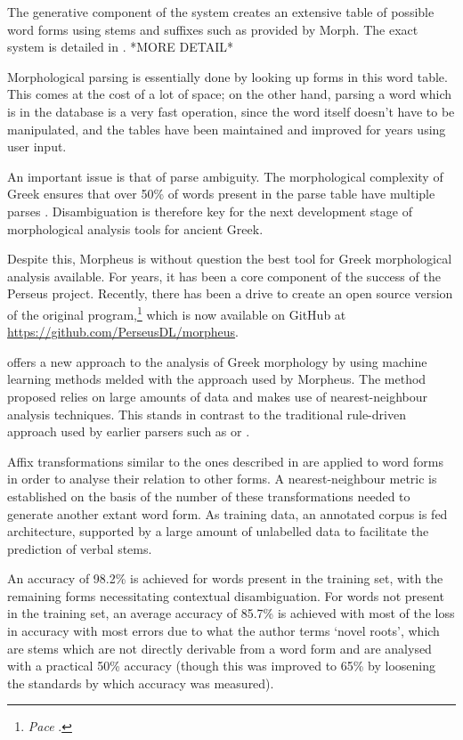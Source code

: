 The generative component of the system creates an extensive table of
possible word forms using stems and suffixes such as provided by
Morph. The exact system is detailed in \cite{crane1991generating}. *MORE DETAIL*

Morphological parsing is essentially done by looking up forms in this
word table. This comes at the cost of a lot of space; on the other
hand, parsing a word which is in the database is a very fast
operation, since the word itself doesn't have to be manipulated, and
the tables have been maintained and improved for years using
user input.

An important issue is that of parse ambiguity. The morphological
complexity of Greek ensures that over 50\% of words present in the
parse table have multiple parses \citep{dik2008}. Disambiguation is
therefore key for the next development stage of morphological analysis
tools for ancient Greek.

Despite this, Morpheus is without question the best tool for Greek
morphological analysis available. For years, it has been a core
component of the success of the Perseus project. Recently, there has
been a drive to create an open source version of the original
program,\footnote{\textit{Pace} \cite{blackwell2009}.} which is now
available on GitHub at \url{https://github.com/PerseusDL/morpheus}.

\cite{lee2008nearest} offers a new approach to the analysis of Greek
morphology by using machine learning methods melded with the approach
used by Morpheus. The method proposed relies on large amounts of data
and makes use of nearest-neighbour analysis techniques. This stands in
contrast to the traditional rule-driven approach used by earlier
parsers such as \cite{packard1973computer} or
\cite{crane1991generating}.

Affix transformations similar to the ones described in
\cite{packard1973computer} are applied to word forms in order to analyse their
relation to other forms. A nearest-neighbour metric is established on
the basis of the number of these transformations needed to generate
another extant word form. As training data, an annotated corpus is fed 
architecture, supported by a large amount of unlabelled data to
facilitate the prediction of verbal stems.

An accuracy of 98.2\% is achieved for words present in the training
set, with the remaining forms necessitating contextual
disambiguation. For words not present in the training set, an average
accuracy of 85.7\% is achieved with most of the loss in accuracy with
most errors due to what the author terms `novel roots', which are
stems which are not directly derivable from a word form and are
analysed with a practical 50\% accuracy (though this was improved to
65\% by loosening the standards by which accuracy was measured).


